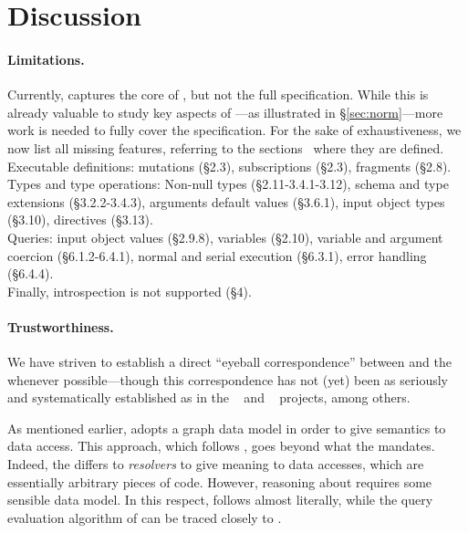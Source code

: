 \section{Discussion}\label{sec:discussion}

\paragraph{Limitations.}

Currently, \gcoql captures the core of \gql, but not the full specification. While this is already valuable to study key aspects of \gql---as illustrated in \S\ref{sec:norm}---more work is needed to fully cover the specification. 
For the sake of exhaustiveness, we now list all missing features, referring to the \spec sections~\cite{gqlspec} where they are defined.\\
Executable definitions:
mutations (\S2.3), subscriptions (\S2.3), fragments (\S2.8).\\
Types and type operations: Non-null types (\S2.11-3.4.1-3.12), schema and type extensions (\S3.2.2-3.4.3), arguments default values (\S3.6.1), input object types (\S3.10), directives (\S3.13).\\
Queries: input object values (\S2.9.8), variables (\S2.10), variable and argument coercion (\S6.1.2-6.4.1), normal and serial execution (\S6.3.1), error handling (\S6.4.4).\\
Finally, introspection is not supported (\S4). 



\paragraph{Trustworthiness.}

We have striven to establish a direct ``eyeball correspondence'' between \gcoql and the \spec whenever possible---though this correspondence has not (yet) been as seriously and systematically established as in the \jscert~\cite{jscert} and \coqr~\cite{coqr} projects, among others. 

As mentioned earlier, \gcoql adopts a graph data model in order to give semantics to data access. This approach, which follows \HP, goes beyond what the \spec mandates. Indeed, the \spec differs to {\em resolvers} to give meaning to data accesses, which are essentially arbitrary pieces of code. However, reasoning about \gql requires some sensible data model. In this respect, \gcoql follows \HP almost literally, while the query evaluation algorithm of \gcoql can be traced closely to \spec.


